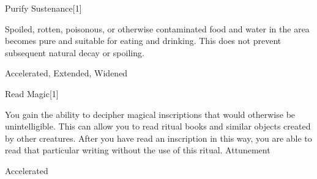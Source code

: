 \begin{spellsection}{Purify Sustenance}[1]
\begin{spellcontent}
\begin{spelltargetinginfo}
\end{spelltargetinginfo}
\begin{spelleffects}
\spelleffect
Spoiled, rotten, poisonous, or otherwise contaminated food and water in the area becomes pure and suitable for eating and drinking.
This does not prevent subsequent natural decay or spoiling.
\end{spelleffects}
\end{spellcontent}
\begin{spellfooter}
 Accelerated, Extended, Widened
\end{spellfooter}
\begin{spellsubcontent}
\end{spellsubcontent}
\end{spellsection}
\begin{spellsection}{Read Magic}[1]
\begin{spellcontent}
\begin{spelltargetinginfo}
\end{spelltargetinginfo}
\begin{spelleffects}
\spelleffect
You gain the ability to decipher magical inscriptions that would otherwise be unintelligible.
This can allow you to read ritual books and similar objects created by other creatures.
After you have read an inscription in this way, you are able to read that particular writing without the use of this ritual.
\spelldur Attunement
\end{spelleffects}
\end{spellcontent}
\begin{spellfooter}
 Accelerated
\end{spellfooter}
\begin{spellsubcontent}
\end{spellsubcontent}
\end{spellsection}
